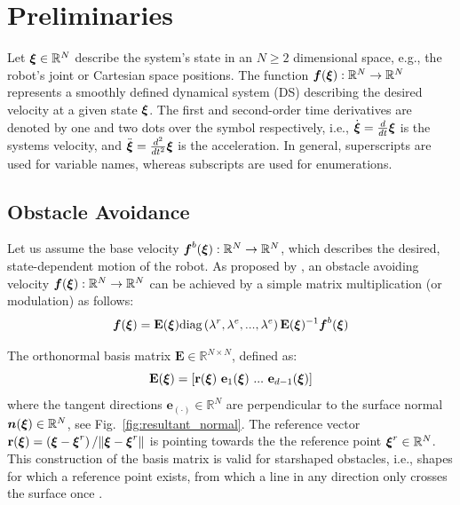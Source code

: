 \section{Preliminaries}
Let $\boldsymbol{\xi} \in \mathbb{R}^N$ describe the system's state in an $N \geq 2$ dimensional space, e.g., the robot's joint or Cartesian space positions.
The function $\boldsymbol{f}(\boldsymbol{\xi}): \mathbb{R}^N \rightarrow \mathbb{R}^N$ represents a smoothly defined dynamical system (DS) describing the desired velocity at a given state $\boldsymbol{\xi}$.  
The first and second-order time derivatives are denoted by one and two dots over the symbol respectively, i.e., $\dot{\boldsymbol{\xi}} =\frac{d}{dt} \boldsymbol{\xi}$ is the systems velocity, and $\ddot{\boldsymbol{\xi}} = \frac{d^2}{dt^2} \boldsymbol{\xi}$ is the acceleration.
In general, superscripts are used for variable names, whereas subscripts are used for enumerations.

\subsection{Obstacle Avoidance}
Let us assume the base velocity $\boldsymbol{f}^b(\boldsymbol{\xi}): \mathbb{R}^N \rightarrow \mathbb{R}^N$, which describes the desired, state-dependent motion of the robot. 
As proposed by \cite{huber2019avoidance, huber2022avoiding}, an obstacle avoiding velocity $\boldsymbol{f}(\boldsymbol{\xi}): \mathbb{R}^N \rightarrow \mathbb{R}^N$ can be achieved by a simple matrix multiplication (or modulation) as follows:
\begin{equation}
  \vecs f(\vecs \xi) = \textbf{E}(\vecs \xi) \text{diag} \left(\lambda^r, \lambda^e, ..., \lambda^e \right) \textbf{E}(\vecs{\xi})^{-1} \vect f^b(\vecs \xi)
  \label{eq:modulated_ds}
\end{equation}

The orthonormal basis matrix $\textbf{E} \in \mathbb{R}^{N \times N}$, defined as:
\begin{equation}
\textbf{E}(\vecs \xi) = \left[ \textbf{r}(\vecs \xi) \ \textbf{e}_1(\vecs \xi) \ ... \ \textbf{e}_{d-1}(\vecs \xi) \right]
\label{eq:matrix_E}
\end{equation}
where the tangent directions $\textbf{e}_{(\cdot)} \in \mathbb{R}^N$ are perpendicular to the surface normal $\boldsymbol{n}(\boldsymbol{\xi}) \in \mathbb{R}^N$, see Fig.~\ref{fig:resultant_normal}. The reference vector $\textbf{r}(\boldsymbol{\xi}) =  \left( \boldsymbol{\xi}-\boldsymbol{\xi}^r \right) / \| \boldsymbol{\xi}-\boldsymbol{\xi} ^r \|$ is pointing towards the the reference point $\boldsymbol{\xi}^r \in \mathbb{R}^N$. 
This construction of the basis matrix is valid for starshaped obstacles, i.e., shapes for which a reference point exists, from which a line in any direction only crosses the surface once \cite{huber2023avoidance}.

